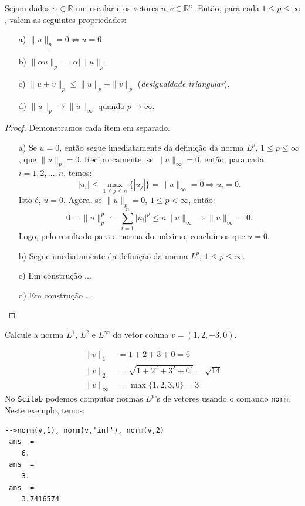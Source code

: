 \begin{prop}
  Sejam dados $\alpha\in\mathbb{R}$ um escalar e os vetores $u,v\in\mathbb{R}^n$. Então, para cada $1\leq p \leq \infty$, valem as seguintes propriedades:
  \begin{itemize}
  \item[a)] $\|u\|_p = 0 \Leftrightarrow u = 0$.
  \item[b)] $\|\alpha u\|_p = |\alpha|\|u\|_p$.
  \item[c)] $\|u + v\|_p \leq \|u\|_p + \|v\|_p$ (\emph{desigualdade triangular}).
  \item[d)] $\|u\|_p\to\|u\|_\infty$ quando $p\to\infty$.
  \end{itemize}
\end{prop}
\begin{proof} Demonstramos cada item em separado.
  \begin{itemize}
  \item[a)] Se $u = 0$, então segue imediatamente da definição da norma $L^p$, $1\leq p \leq \infty$, que $\|u\|_p = 0$. Reciprocamente, se  $\|u\|_\infty = 0$, então, para cada $i=1, 2, \ldots, n$, temos:
    \begin{equation*}
      |u_i| \leq \max_{1\leq j \leq n}\{|u_j|\} = \|u\|_{\infty} = 0\Rightarrow u_i = 0.
    \end{equation*}
Isto é, $u = 0$. Agora, se $\|u\|_p = 0$, $1\leq p < \infty$, então:
\begin{equation*}
  0 = \|u\|_p^p := \sum_{i=1}^n |u_i|^p \leq n\|u\|_\infty \Rightarrow  \|u\|_\infty = 0.
\end{equation*}
Logo, pelo resultado para a norma do máximo, concluímos que $u=0$.
\item[b)] Segue imediatamente da definição da norma $L^p$, $1\leq p \leq \infty$. 
\item[c)] Em construção ...
\item[d)] Em construção ...
\end{itemize}
\end{proof}

\begin{ex}
  Calcule a norma $L^1$, $L^2$ e $L^\infty$ do vetor coluna $v = (1, 2, -3, 0)$.
\end{ex}
\begin{sol}
  \begin{align*}
    \|v\|_1 &= 1+2+3+0=6\\
    \|v\|_2 &= \sqrt{1+2^2+3^2+0^2}=\sqrt{14}\\
    \|v\|_\infty &= \max\{1,2,3,0\}=3
  \end{align*}
\ifisscilab
No \verb+Scilab+ podemos computar normas $L^p$'s de vetores usando o comando \verb+norm+. Neste exemplo, temos:
\begin{verbatim}
-->norm(v,1), norm(v,'inf'), norm(v,2)
 ans  =
    6.  
 ans  =
    3.  
 ans  =
    3.7416574  
\end{verbatim}
\fi
\end{sol}


